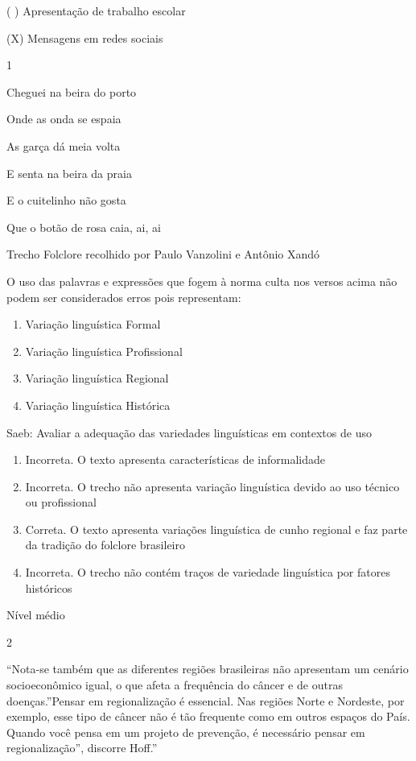 {{\begin{itemize}
\begin{itemize}
( ) Apresentação de trabalho escolar

(X) Mensagens em redes sociais


\num{1}

Cheguei na beira do porto

Onde as onda se espaia

As garça dá meia volta

E senta na beira da praia

E o cuitelinho não gosta

Que o botão de rosa caia, ai, ai

Trecho Folclore recolhido por Paulo Vanzolini e Antônio Xandó

O uso das palavras e expressões que fogem à norma culta nos versos acima
não podem ser considerados erros pois representam:

\begin{enumerate}
\def\labelenumi{\alph{enumi})}
\item
  Variação linguística Formal
\item
  Variação linguística Profissional
\item
  Variação linguística Regional
\item
  Variação linguística Histórica
\end{enumerate}

Saeb: Avaliar a adequação das variedades linguísticas em contextos de
uso

\begin{enumerate}
\def\labelenumi{\arabic{enumi}.}
\item
  Incorreta. O texto apresenta características de informalidade
\item
  Incorreta. O trecho não apresenta variação linguística devido ao uso
  técnico ou profissional
\item
  Correta. O texto apresenta variações linguística de cunho regional e
  faz parte da tradição do folclore brasileiro
\item
  Incorreta. O trecho não contém traços de variedade linguística por
  fatores históricos
\end{enumerate}

Nível médio

\num{2}

``Nota-se também que as diferentes regiões brasileiras não apresentam um
cenário socioeconômico igual, o que afeta a frequência do câncer e de
outras doenças.''Pensar em regionalização é essencial. Nas regiões Norte
e Nordeste, por exemplo, esse tipo de câncer não é tão frequente como em
outros espaços do País. Quando você pensa em um projeto de prevenção, é
necessário pensar em regionalização'', discorre Hoff.''


\end{itemize}
\end{itemize}}}
